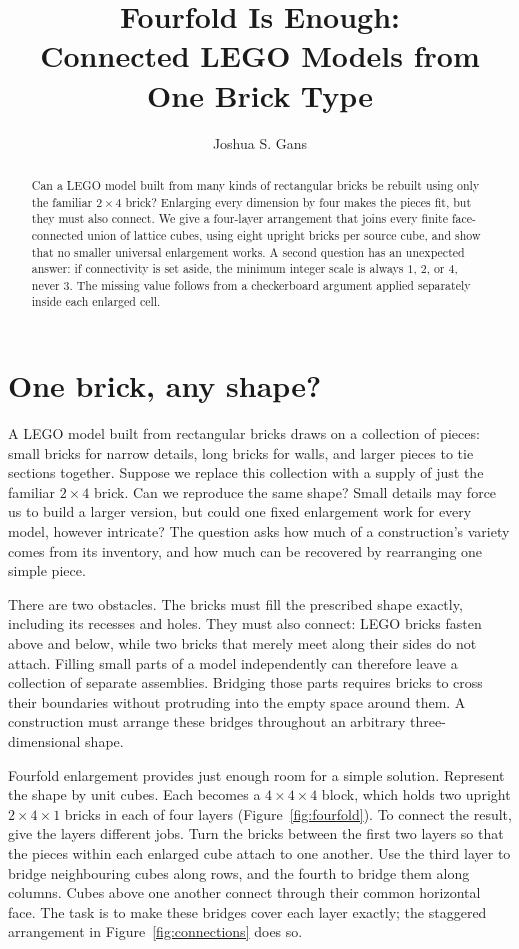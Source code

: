 \documentclass[10pt,reqno]{amsart}
\title[Fourfold Is Enough]{Fourfold Is Enough:\\
Connected LEGO Models from One Brick Type}
\author{Joshua S. Gans}
\date{}
\begin{document}
\begin{abstract}
Can a LEGO model built from many kinds of rectangular bricks be rebuilt
using only the familiar $2\times4$ brick? Enlarging every dimension by
four makes the pieces fit, but they must also connect. We give a
four-layer arrangement that joins every finite face-connected union of
lattice cubes, using eight upright bricks per source cube, and show that
no smaller universal enlargement works. A second question has an
unexpected answer: if connectivity is set aside, the minimum integer
scale is always $1$, $2$, or $4$, never $3$. The missing value follows
from a checkerboard argument applied separately inside each enlarged cell.
\end{abstract}
\maketitle

\section{One brick, any shape?}

A LEGO model built from rectangular bricks draws on a collection of pieces: small bricks
for narrow details, long bricks for walls, and larger pieces to tie
sections together. Suppose we replace this collection with a supply of
just the familiar $2\times4$ brick. Can we reproduce the same shape?
Small details may force us to build a larger version, but could one
fixed enlargement work for every model, however intricate? The question
asks how much of a construction's variety comes from its inventory,
and how much can be recovered by rearranging one simple piece.

There are two obstacles. The bricks must fill the prescribed shape
exactly, including its recesses and holes. They must also connect:
LEGO bricks fasten above and below, while two bricks that merely meet
along their sides do not attach. Filling small parts of a model
independently can therefore leave a collection of separate assemblies.
Bridging those parts requires bricks to cross their boundaries without
protruding into the empty space around them. A construction must arrange
these bridges throughout an arbitrary three-dimensional shape.

Fourfold enlargement provides just enough room for a simple solution.
Represent the shape by unit cubes. Each becomes a $4\times4\times4$
block, which holds two upright $2\times4\times1$ bricks in each of four
layers (Figure~\ref{fig:fourfold}). To connect the result, give the layers
different jobs. Turn the bricks between the first two layers so that
the pieces within each enlarged cube attach to one another. Use the
third layer to bridge neighbouring cubes along rows, and the fourth to
bridge them along columns. Cubes above one another connect through
their common horizontal face. The task is to make these bridges cover
each layer exactly; the staggered arrangement in
Figure~\ref{fig:connections} does so.
\end{document}
